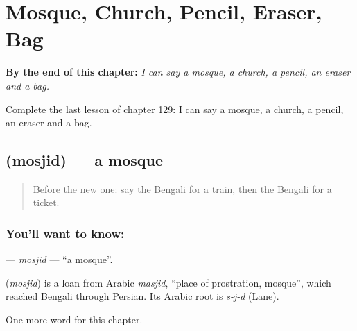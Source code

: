 
\chapter{Mosque, Church, Pencil, Eraser, Bag}
\label{ch:bn-mosque-church-pencil-eraser-bag}

\begin{chapteropening}
\textbf{By the end of this chapter:} \emph{I can say a mosque, a church, a pencil, an eraser and a bag.}

Complete the last lesson of chapter 129: I can say a mosque, a church, a pencil, an eraser and a bag.
\end{chapteropening}

\section[\texorpdfstring{\bn{মসজিদ} (mosjid)}{মসজিদ (mosjid)}]{ (mosjid) — a mosque}

\label{lesson:BN-C129-mosjid}



\begin{quote}
Before the new one: say the Bengali for a train, then the Bengali for a ticket.
\end{quote}

\subsection*{You'll want to know: }
\textbf{} — \emph{mosjid} — \textquotedblleft{}a mosque\textquotedblright{}.

\begin{cousinweb}
\textbf{} (\emph{mosjid}) is a loan from Arabic \emph{masjid}, \textquotedblleft{}place of prostration, mosque\textquotedblright{}, which reached Bengali through Persian. Its Arabic root is \emph{s-j-d} (Lane).
\end{cousinweb}

\begin{grammarlens}[title={What you've built}]
One more word for this chapter.
\end{grammarlens}

